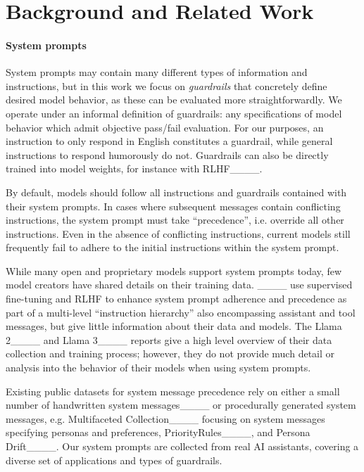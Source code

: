\section{Background and Related Work}
\paragraph{System prompts}
System prompts may contain many different types of information and instructions, but in this work we focus on \textit{guardrails} that concretely define desired model behavior, as these can be evaluated more straightforwardly.
We operate under an informal definition of guardrails: any specifications of model behavior which admit objective pass/fail evaluation.
For our purposes, an instruction to only respond in English constitutes a guardrail, while general instructions to respond humorously do not.
Guardrails can also be directly trained into model weights, for instance with RLHF____.

By default, models should follow all instructions and guardrails contained with their system prompts.
In cases where subsequent messages contain conflicting instructions, the system prompt must take ``precedence'', i.e. override all other instructions.
Even in the absence of conflicting instructions, current models still frequently fail to adhere to the initial instructions within the system prompt.

While many open and proprietary models support system prompts today, few model creators have shared details on their training data.
____ use supervised fine-tuning and RLHF to enhance system prompt adherence and precedence as part of a multi-level ``instruction hierarchy'' also encompassing assistant and tool messages, but give little information about their data and models.
The Llama 2____ and Llama 3____ reports give a high level overview of their data collection and training process; however, they do not provide much detail or analysis into the behavior of their models when using system prompts.

Existing public datasets for system message precedence rely on either a small number of handwritten system messages____ or procedurally generated system messages, e.g. Multifaceted Collection____ focusing on system messages specifying personas and preferences, PriorityRules____, and Persona Drift____.
Our system prompts are collected from real AI assistants, covering a diverse set of applications and types of guardrails.


